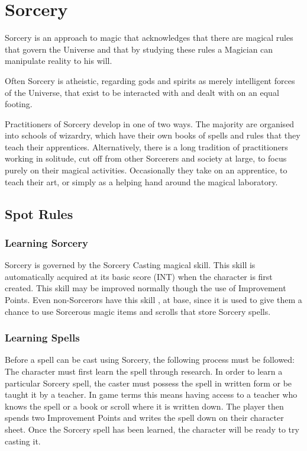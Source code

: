 \chapter{Sorcery}
\label{ch:sorcery}

Sorcery is an approach to magic that acknowledges that there are magical rules that govern the Universe and that by studying these rules a Magician can manipulate reality to his will.

Often Sorcery is atheistic, regarding gods and spirits as merely intelligent forces of the Universe, that exist to be interacted with and dealt with on an equal footing. 

Practitioners of Sorcery develop in one of two ways. The majority are organised into schools of wizardry, which have their own books of spells and rules that they teach their apprentices. Alternatively, there is a long tradition of practitioners working in solitude, cut off from other Sorcerers and society at large, to focus purely on their magical activities. Occasionally they take on an apprentice, to teach their art, or simply as a helping hand around the magical laboratory.


\section{Spot Rules}

\subsection{Learning Sorcery}
Sorcery is governed by the Sorcery Casting magical skill. This skill is automatically acquired at its basic score (INT) when the character is first created. This skill may be improved normally though the use of Improvement Points.  Even non-Sorcerors have this skill , at base, since it is used to give them a chance to use Sorcerous magic items and scrolls that store Sorcery spells. 

\subsection{Learning Spells}
Before a spell can be cast using Sorcery, the following process must be followed:
The character must first learn the spell through research. In order to learn a particular Sorcery spell, the caster must possess the spell in written form or be taught it by a teacher. In game terms this means having access to a teacher who knows the spell or a book or scroll where it is written down. The player then spends two Improvement Points and writes the spell down on their character sheet. Once the Sorcery spell has been learned, the character will be ready to try casting it.



